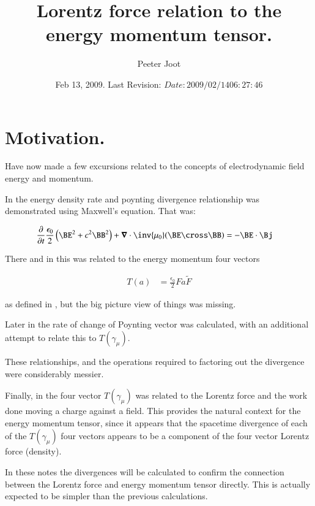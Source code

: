 \documentclass{article}
\title{ Lorentz force relation to the energy momentum tensor. }
\author{Peeter Joot}
\date{ Feb 13, 2009.  Last Revision: $Date: 2009/02/14 06:27:46 $ }
\begin{document}
\maketitle{}

\tableofcontents

\section{ Motivation. }

Have now made a few excursions related to the concepts of electrodynamic
field energy and momentum.

In \cite{PJpoynting} the energy density rate and poynting divergence 
relationship was demonstrated using Maxwell's equation.  That was:

\begin{align}
\PD{t}{}\frac{\epsilon_0}{2} \left(\BE^2 + c^2 \BB^2\right) + \spacegrad \cdot \inv{\mu_0}(\BE \cross \BB) &= -\BE \cdot \Bj 
\end{align}

There and in \cite{PJemstresstensor} this was related to the 
energy momentum four vectors

\begin{align}
T(a) &= \frac{\epsilon_0}{2} F a \tilde{F}
\end{align}

as defined
in \cite{doran2003gap}, but the big picture view 
of things was missing.

Later in \cite{PJpoyntingRate} the rate of change of Poynting vector
was calculated, with an additional attempt to relate this to $T(\gamma_\mu)$.

These relationships, and the operations required to factoring out the divergence were considerably messier.

Finally, in \cite{PJelectricFieldEnergy} the four vector $T(\gamma_\mu)$
was related to the Lorentz force and the work done moving a charge against
a field.  This provides the natural context for the energy momentum tensor, 
since it appears that the spacetime divergence of each of the
$T(\gamma_\mu)$ four vectors appears to be a component of the
four vector Lorentz force (density).  

In these notes the divergences will be calculated to confirm the
connection between the Lorentz force and energy momentum tensor directly.
This is actually expected to be simpler than the previous calculations.
\end{document}
